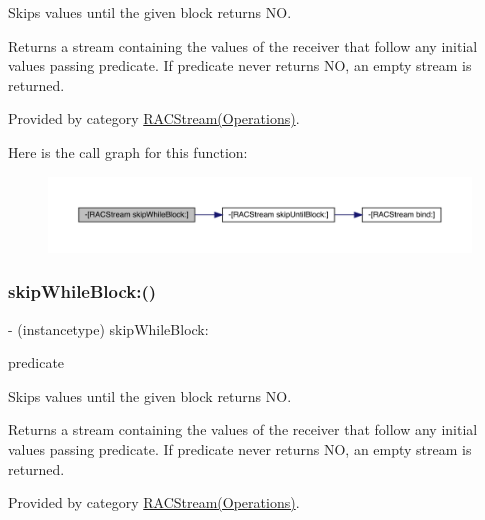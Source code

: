Skips values until the given block returns {\ttfamily NO}.

Returns a stream containing the values of the receiver that follow any initial values passing {\ttfamily predicate}. If {\ttfamily predicate} never returns {\ttfamily NO}, an empty stream is returned. 

Provided by category \mbox{\hyperlink{category_r_a_c_stream_07_operations_08_a1e323c308071aed5e01627d4d96ca9c8}{R\+A\+C\+Stream(\+Operations)}}.

Here is the call graph for this function\+:\nopagebreak
\begin{figure}[H]
\begin{center}
\leavevmode
\includegraphics[width=350pt]{interface_r_a_c_stream_a1e323c308071aed5e01627d4d96ca9c8_cgraph}
\end{center}
\end{figure}
\mbox{\label{interface_r_a_c_stream_a1e323c308071aed5e01627d4d96ca9c8}} 
\subsubsection{\texorpdfstring{skip\+While\+Block\+:()}{skipWhileBlock:()}\hspace{0.1cm}{\footnotesize\ttfamily [2/3]}}
{\footnotesize\ttfamily -\/ (instancetype) skip\+While\+Block\+: \begin{DoxyParamCaption}\item[{(B\+O\+OL($^\wedge$)(id x))}]{predicate }\end{DoxyParamCaption}}

Skips values until the given block returns {\ttfamily NO}.

Returns a stream containing the values of the receiver that follow any initial values passing {\ttfamily predicate}. If {\ttfamily predicate} never returns {\ttfamily NO}, an empty stream is returned. 

Provided by category \mbox{\hyperlink{category_r_a_c_stream_07_operations_08_a1e323c308071aed5e01627d4d96ca9c8}{R\+A\+C\+Stream(\+Operations)}}.

